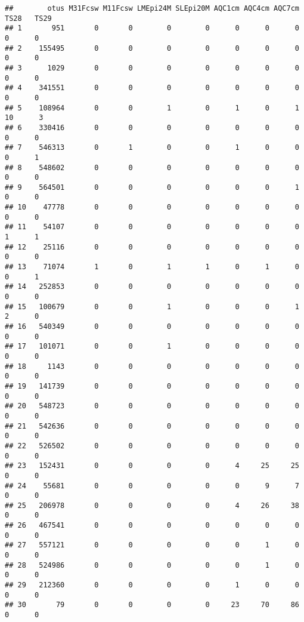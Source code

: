 \documentclass[
]{article}
\begin{document}
\begin{verbatim}
##        otus M31Fcsw M11Fcsw LMEpi24M SLEpi20M AQC1cm AQC4cm AQC7cm  TS28   TS29
## 1       951       0       0        0        0      0      0      0     0      0
## 2    155495       0       0        0        0      0      0      0     0      0
## 3      1029       0       0        0        0      0      0      0     0      0
## 4    341551       0       0        0        0      0      0      0     0      0
## 5    108964       0       0        1        0      1      0      1    10      3
## 6    330416       0       0        0        0      0      0      0     0      0
## 7    546313       0       1        0        0      1      0      0     0      1
## 8    548602       0       0        0        0      0      0      0     0      0
## 9    564501       0       0        0        0      0      0      1     0      0
## 10    47778       0       0        0        0      0      0      0     0      0
## 11    54107       0       0        0        0      0      0      0     1      1
## 12    25116       0       0        0        0      0      0      0     0      0
## 13    71074       1       0        1        1      0      1      0     0      1
## 14   252853       0       0        0        0      0      0      0     0      0
## 15   100679       0       0        1        0      0      0      1     2      0
## 16   540349       0       0        0        0      0      0      0     0      0
## 17   101071       0       0        1        0      0      0      0     0      0
## 18     1143       0       0        0        0      0      0      0     0      0
## 19   141739       0       0        0        0      0      0      0     0      0
## 20   548723       0       0        0        0      0      0      0     0      0
## 21   542636       0       0        0        0      0      0      0     0      0
## 22   526502       0       0        0        0      0      0      0     0      0
## 23   152431       0       0        0        0      4     25     25     0      0
## 24    55681       0       0        0        0      0      9      7     0      0
## 25   206978       0       0        0        0      4     26     38     0      0
## 26   467541       0       0        0        0      0      0      0     0      0
## 27   557121       0       0        0        0      0      1      0     0      0
## 28   524986       0       0        0        0      0      1      0     0      0
## 29   212360       0       0        0        0      1      0      0     0      0
## 30       79       0       0        0        0     23     70     86     0      0

\end{verbatim}
\end{document}
